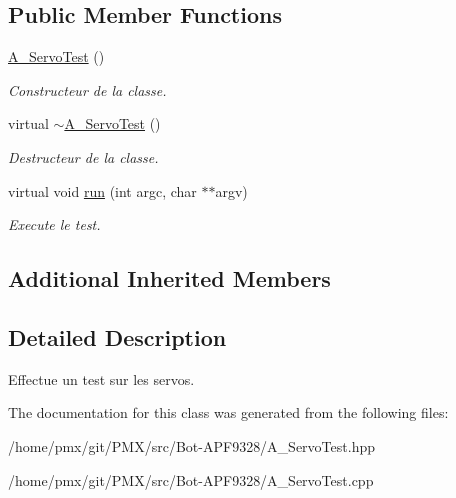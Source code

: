 \subsection*{Public Member Functions}
\begin{DoxyCompactItemize}
\item 
\mbox{\label{classA__ServoTest_ad1829a0eb4adf70b6c483b2889b454ce}} 
\hyperlink{classA__ServoTest_ad1829a0eb4adf70b6c483b2889b454ce}{A\+\_\+\+Servo\+Test} ()
\begin{DoxyCompactList}\small\item\em Constructeur de la classe. \end{DoxyCompactList}\item 
\mbox{\label{classA__ServoTest_ac8e7d107db7ab2524ee4eeb9f31184dd}} 
virtual \hyperlink{classA__ServoTest_ac8e7d107db7ab2524ee4eeb9f31184dd}{$\sim$\+A\+\_\+\+Servo\+Test} ()
\begin{DoxyCompactList}\small\item\em Destructeur de la classe. \end{DoxyCompactList}\item 
\mbox{\label{classA__ServoTest_aed1e78e5ad48ce31a9b419cf399ac2cc}} 
virtual void \hyperlink{classA__ServoTest_aed1e78e5ad48ce31a9b419cf399ac2cc}{run} (int argc, char $\ast$$\ast$argv)
\begin{DoxyCompactList}\small\item\em Execute le test. \end{DoxyCompactList}\end{DoxyCompactItemize}
\subsection*{Additional Inherited Members}


\subsection{Detailed Description}
Effectue un test sur les servos. 

The documentation for this class was generated from the following files\+:\begin{DoxyCompactItemize}
\item 
/home/pmx/git/\+P\+M\+X/src/\+Bot-\/\+A\+P\+F9328/A\+\_\+\+Servo\+Test.\+hpp\item 
/home/pmx/git/\+P\+M\+X/src/\+Bot-\/\+A\+P\+F9328/A\+\_\+\+Servo\+Test.\+cpp\end{DoxyCompactItemize}
